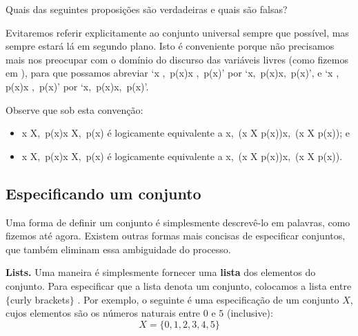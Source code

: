 \begin{exercise}
Quais das seguintes proposições são verdadeiras e quais são falsas?
  \in {} \qquad {} \in {} \qquad {} \in {} \qquad {} \in {} \qquad {} \in {}   \in {} \qquad {} \in {} \qquad {} \in {} \qquad {} \in {} \qquad {} \in {} 
\end{exercise}

Evitaremos referir explicitamente ao conjunto universal  sempre que possível, mas sempre estará lá em segundo plano. Isto é conveniente porque não precisamos mais nos preocupar com o domínio do discurso das variáveis ​​livres (como fizemos em ), para que possamos abreviar `\forall x \in {},\, p(x)\forall x \in {},\, p(x)' por `\forall x,\, p(x)\forall x,\, p(x)', e `\exists x \in {},\, p(x)\exists x \in {},\, p(x)' por `\exists x,\, p(x)\exists x,\, p(x)'.

Observe que sob esta convenção:
\begin{itemize}
\item \forall x \in X,\, p(x)\forall x \in X,\, p(x) é logicamente equivalente a \forall x,\, (x \in X \Rightarrow p(x))\forall x,\, (x \in X \Rightarrow p(x)); e
\item \exists x \in X,\, p(x)\exists x \in X,\, p(x) é logicamente equivalente a \exists x,\, (x \in X \wedge p(x))\exists x,\, (x \in X \wedge p(x)).
\end{itemize}

\subsection*{Especificando um conjunto}
Uma forma de definir um conjunto é simplesmente descrevê-lo em palavras, como fizemos até agora. Existem outras formas mais concisas de especificar conjuntos, que também eliminam essa ambiguidade do processo.

\textbf{Lists.}
Uma maneira é simplesmente fornecer uma \textbf{lista} dos elementos do conjunto. Para especificar que a lista denota um conjunto, colocamos a lista entre $\{$curly brackets$\}$ \inlatex{\{,\textbackslash{}\}}\lindexmmc{\{\dots\textbackslash{}\}}{$\{\dots\}$}. Por exemplo, o seguinte é uma especificação de um conjunto $X$, cujos elementos são os números naturais entre $0$ e $5$ (inclusive):
\[ X = \{ 0, 1, 2, 3, 4, 5 \} \]

